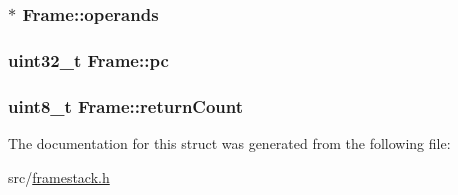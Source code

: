 \subsubsection[{\texorpdfstring{operands}{operands}}]{$\ast$ Frame\+::operands}\hypertarget{structFrame_a0be587b8515083ff6d3c4e55918a7657}{}\label{structFrame_a0be587b8515083ff6d3c4e55918a7657}
\subsubsection[{\texorpdfstring{pc}{pc}}]{\setlength{\rightskip}{0pt plus 5cm}uint32\+\_\+t Frame\+::pc}\hypertarget{structFrame_a91e50d2091184efb52b6d7c0c21fd4b2}{}\label{structFrame_a91e50d2091184efb52b6d7c0c21fd4b2}
\subsubsection[{\texorpdfstring{return\+Count}{returnCount}}]{\setlength{\rightskip}{0pt plus 5cm}uint8\+\_\+t Frame\+::return\+Count}\hypertarget{structFrame_aa5732143b7e6cc091fc23a3222364ed0}{}\label{structFrame_aa5732143b7e6cc091fc23a3222364ed0}


The documentation for this struct was generated from the following file\+:\begin{DoxyCompactItemize}
\item 
src/\hyperlink{framestack_8h}{framestack.\+h}\end{DoxyCompactItemize}
